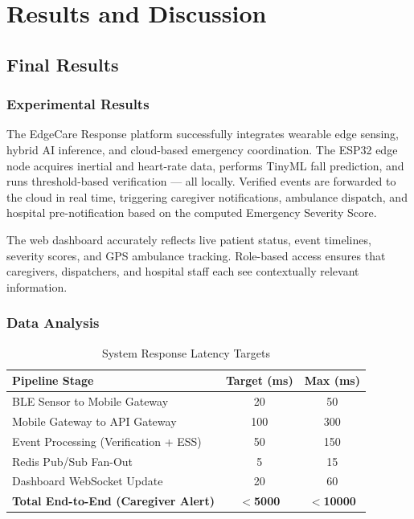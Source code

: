 \chapter{Results and Discussion}

\section[Final Results]{\textbf{Final Results}}

\subsection{Experimental Results}

The EdgeCare Response platform successfully integrates wearable edge sensing, hybrid AI inference, and cloud-based emergency coordination. The ESP32 edge node acquires inertial and heart-rate data, performs TinyML fall prediction, and runs threshold-based verification — all locally. Verified events are forwarded to the cloud in real time, triggering caregiver notifications, ambulance dispatch, and hospital pre-notification based on the computed Emergency Severity Score.

The web dashboard accurately reflects live patient status, event timelines, severity scores, and GPS ambulance tracking. Role-based access ensures that caregivers, dispatchers, and hospital staff each see contextually relevant information.

\subsection{Data Analysis}

\begin{table}[htb]
\fontsize{10}{12}\selectfont
\caption{System Response Latency Targets}
\label{tab:latency}
\centering
\begin{tabular}{|p{5.5cm}|c|c|}
	\hline
	\textbf{Pipeline Stage} & \textbf{Target (ms)} & \textbf{Max (ms)} \\
	\hline
	BLE Sensor to Mobile Gateway & 20 & 50 \\
	\hline
	Mobile Gateway to API Gateway & 100 & 300 \\
	\hline
	Event Processing (Verification + ESS) & 50 & 150 \\
	\hline
	Redis Pub/Sub Fan-Out & 5 & 15 \\
	\hline
	Dashboard WebSocket Update & 20 & 60 \\
	\hline
	\textbf{Total End-to-End (Caregiver Alert)} & \textbf{$<$5000} & \textbf{$<$10000} \\
	\hline
\end{tabular}
\end{table}


